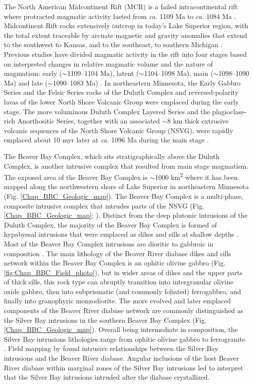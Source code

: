 The North American Midcontinent Rift (MCR) is a failed intracontinental rift where protracted magmatic activity lasted from \textit{ca.} 1109 Ma to \textit{ca.} 1084 Ma \citep{Swanson-Hysell2019a}. Midcontinent Rift rocks extensively outcrop in today's Lake Superior region, with the total extent traceable by arcuate magnetic and gravity anomalies that extend to the southwest to Kansas, and to the southeast, to southern Michigan \citep{Hinze2020a}. Previous studies have divided magmatic activity in the rift into four stages based on interpreted changes in relative magmatic volume and the nature of magmatism: early ($\sim$1109--1104 Ma), latent ($\sim$1104--1098 Ma), main ($\sim$1098--1090 Ma) and late ($\sim$1090--1083 Ma) \citep{Vervoort2007a, Heaman2007a, Miller2013a}. In northeastern Minnesota, the Early Gabbro Series and the Felsic Series rocks of the Duluth Complex and reversed-polarity lavas of the lower North Shore Volcanic Group were emplaced during the early stage. The more voluminous Duluth Complex Layered Series and the plagioclase-rich Anorthositic Series, together with an associated $\sim$8 km thick extrusive volcanic sequences of the North Shore Volcanic Group (NSVG), were rapidly emplaced about 10 myr later at \textit{ca.} 1096 Ma during the main stage \citep{Paces1993a, Swanson-Hysell2021a}. 

The Beaver Bay Complex, which sits stratigraphically above the Duluth Complex, is another intrusive complex that resulted from main stage magmatism. The exposed area of the Beaver Bay Complex is $\sim$1000 km\textsuperscript{2} where it has been mapped along the northwestern shore of Lake Superior in northeastern Minnesota (Fig. \ref{Chap_BBC_Geologic_map}). The Beaver Bay Complex is a multi-phase, composite intrusive complex that intrudes parts of the NSVG (Fig. \ref{Chap_BBC_Geologic_map}; \cite{Miller1997a, Swanson-Hysell2021a}). Distinct from the deep plutonic intrusions of the Duluth Complex, the majority of the Beaver Bay Complex is formed of hypabyssal intrusions that were emplaced as dikes and sills at shallow depths \citep{Miller1997a}. Most of the Beaver Bay Complex intrusions are dioritic to gabbroic in composition \citep{Miller1997a}. The main lithology of the Beaver River diabase dikes and sills network within the Beaver Bay Complex is an ophitic olivine gabbro (Fig. \ref{fig:Chap_BBC_Field_photo}), but in wider areas of dikes and the upper parts of thick sills, this rock type can abruptly transition into intergranular olivine oxide gabbro, then into subprismatic (and commonly foliated) ferrogabbro, and finally into granophyric monzodiorite. The more evolved and later emplaced components of the Beaver River diabase network are commonly distinguished as the Silver Bay intrusions in the southern Beaver Bay Complex (Fig. \ref{Chap_BBC_Geologic_map}). Overall being intermediate in composition, the Silver Bay intrusions lithologies range from ophitic olivine gabbro to ferrogranite \citep{Shank1989a}. Field mapping by \cite{Miller1994a} found intrusive relationships between the Silver Bay intrusions and the Beaver River diabase. Angular inclusions of the host Beaver River diabase within marginal zones of the Silver Bay intrusions led \cite{Miller1997a} to interpret that the Silver Bay intrusions intruded after the diabase crystallized.


